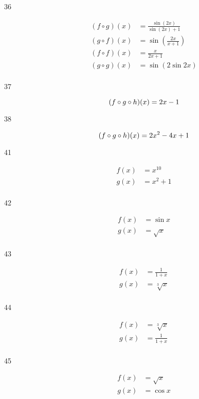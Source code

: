 \documentclass[letterpaper, landscape]{exam}
\begin{document}
\begin{description}
      \item[36]
        \begin{align*}
          (f \circ g)(x) &= \frac{\sin (2 x) }{\sin (2 x) +1} \\
          (g \circ f)(x) &= \sin \left( \frac{ 2x }{x+1} \right) \\
          (f \circ f)(x) &= \frac{x}{2x + 1} \\
          (g \circ g)(x) &= \sin ( 2 \sin 2x) \\
        \end{align*}

      \item[37]
        \[
          (f \circ g \circ h)(x) = 2x - 1 \\
        \]
  
      \item[38]
        \[
          (f \circ g \circ h)(x) = 2 x^2-4 x+1 \\
        \]
  
      \item[41]
        \begin{align*}
          f(x) &= x^{10} \\
          g(x) &= x^2 + 1 \\
        \end{align*}

      \item[42]
        \begin{align*}
          f(x) &= \sin x \\
          g(x) &= \sqrt{x} \\
        \end{align*}

      \item[43]
        \begin{align*}
          f(x) &= \frac{1}{1 + x} \\
          g(x) &= \sqrt[3]{x} \\
        \end{align*}

      \item[44]
        \begin{align*}
          f(x) &= \sqrt[3]{x} \\
          g(x) &= \frac{1}{1 + x} \\
        \end{align*}

      \item[45]
        \begin{align*}
          f(x) &= \sqrt{x} \\
          g(x) &= \cos x \\
        \end{align*}


\end{description}
\end{document}
